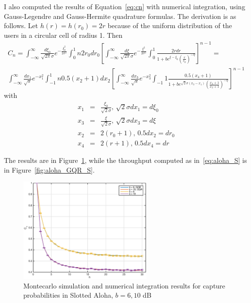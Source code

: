 \documentclass[10pt]{article}
\begin{document}
I also computed the results of Equation~\eqref{eq:cn} with numerical integration, using Gauss-Legendre and Gauss-Hermite quadrature formulas. The derivation is as follows. Let $h(r) = h(r_0) = 2r$ because of the uniform distribution of the users in a circular cell of radius 1. Then
\begin{eqnarray}
  C_n = \int_{-\infty}^{\infty} \frac{d\xi_0}{\sqrt{2\pi}\sigma} e^{-\frac{\xi_0^2}{2\sigma^2}} \int_0^1 n 2 r_0 dr_0 \left[
  \int_{-\infty}^{\infty} 
  \frac{d\xi}{\sqrt{2\pi}\sigma} 
  e^{-\frac{\xi^2}{2\sigma^2}} 
  \int_{0}^{1} 
  \frac{2r dr}{1 + b e^{\xi - \xi_0} \left( \frac{r}{r_0} \right)^{-\eta}}
  \right]^{n-1}
  = \\
  \int_{-\infty}^{\infty} \frac{dx_1}{\sqrt{\pi}}e^{-x_1^2}
  \int_{-1}^{1} n 0.5 (x_2 + 1) dx_2
  \left[
  \int_{-\infty}^{\infty} \frac{dx_3}{\sqrt{\pi}}e^{-x_3^2}
  \int_{-1}{1} \frac{0.5(x_4+1)}{1 + b e^{\sqrt{2}\sigma(x_3 - x_1)}\left( \frac{x_4+1}{x_2+1} \right)^{-\eta}}
  \right]^{n-1}
\end{eqnarray}
with 
\begin{eqnarray*}
x_1 &=& \frac{\xi_0}{\sqrt{2}\sigma}, \, \sqrt{2}\sigma dx_1 =  d\xi_0 \\
x_3 &=& \frac{\xi}{\sqrt{2}\sigma}, \, \sqrt{2}\sigma dx_3 = d\xi \\
x_2 &=& 2(r_0 + 1), \, 0.5 dx_2 = dr_0 \\
x_4 &=& 2(r + 1), \, 0.5 dx_4 = dr
\end{eqnarray*}

The results are in Figure~\ref{fig:aloha_GQR}, while the throughput computed as in~\eqref{eq:aloha_S} is in Figure~\ref{fig:aloha_GQR_S}.

\begin{figure}[h!]
  \centering
  \includegraphics[width = 0.6\textwidth]{aloha_GQR}
  \caption{Montecarlo simulation and numerical integration results for capture probabilities in Slotted Aloha, $b = 6, 10$ dB}
  \label{fig:aloha_GQR}
\end{figure}
\end{document}
